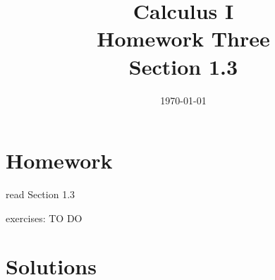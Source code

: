 \documentclass[letterpaper, landscape]{exam}
\title{Calculus I \\ Homework Three \\ Section 1.3}
\author{}
\date{\today}
\begin{document}
  \maketitle

  \section{Homework}
    \begin{itemize*}
      \item read Section 1.3
      \item exercises: TO DO
    \end{itemize*}

  \ifprintanswers

    \section{Solutions}
\end{document}
